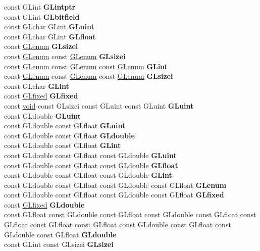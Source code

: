 \begin{DoxyCompactItemize}
\begin{tabbing}
\>const GLint {\bfseries GLintptr}\\
\>const GLint {\bfseries GLbitfield}\\
\>const GLchar GLint {\bfseries GLuint}\\
\>const GLchar GLint {\bfseries GLfloat}\\
\>const \hyperlink{interfacevoid}{GLenum} {\bfseries GLsizei}\\
\>const \hyperlink{interfacevoid}{GLenum} const \hyperlink{interfacevoid}{GLenum} {\bfseries GLsizei}\\
\>const \hyperlink{interfacevoid}{GLenum} const \hyperlink{interfacevoid}{GLenum} const \hyperlink{interfacevoid}{GLenum} {\bfseries GLint}\\
\>const \hyperlink{interfacevoid}{GLenum} const \hyperlink{interfacevoid}{GLenum} const \hyperlink{interfacevoid}{GLenum} {\bfseries GLsizei}\\
\>const GLchar {\bfseries GLint}\\
\>const \hyperlink{glheader_8h_ad6d3fa892df40dedf48ee6d84529ae5e}{GLfixed} {\bfseries GLfixed}\\
\>const \hyperlink{interfacevoid}{void} const GLsizei const GLuint const GLuint {\bfseries GLuint}\\
\>const GLdouble {\bfseries GLuint}\\
\>const GLdouble const GLfloat {\bfseries GLuint}\\
\>const GLdouble const GLfloat {\bfseries GLdouble}\\
\>const GLdouble const GLfloat {\bfseries GLint}\\
\>const GLdouble const GLfloat const GLdouble {\bfseries GLuint}\\
\>const GLdouble const GLfloat const GLdouble {\bfseries GLfloat}\\
\>const GLdouble const GLfloat const GLdouble {\bfseries GLint}\\
\>const GLdouble const GLfloat const GLdouble const GLfloat {\bfseries GLenum}\\
\>const GLdouble const GLfloat const GLdouble const GLfloat {\bfseries GLfixed}\\
\>const \hyperlink{glheader_8h_ad6d3fa892df40dedf48ee6d84529ae5e}{GLfixed} {\bfseries GLdouble}\\
\>const GLfloat const GLdouble const GLfloat const GLdouble const GLfloat const GLfloat const GLfloat const GLfloat const GLdouble const GLfloat const GLdouble const GLfloat {\bfseries GLdouble}\\
\>const GLint const GLsizei {\bfseries GLsizei}\\

\end{tabbing}
\end{DoxyCompactItemize}
